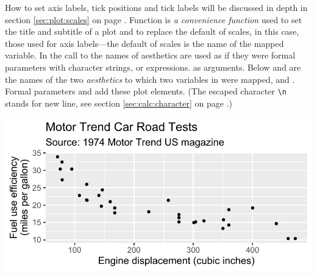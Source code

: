 \documentclass[krantz2]{krantz}\usepackage{knitr}
\begin{document}
How to set axis labels, tick positions and tick labels will be discussed in depth in section \ref{sec:plot:scales} on page \pageref{sec:plot:scales}. Function  is \emph{a convenience function} used to set the title and subtitle of a plot and to replace the default  of scales, in this case, those used for axis labels---the default  of scales is the name of the mapped variable. In the call to  the names of aesthetics are used as if they were formal parameters with character strings, or \Rlang expressions. as arguments. Below  and  are the names of the two \emph{aesthetics} to which two variables in  were mapped,  and . Formal parameters  and  add these plot elements. (The escaped character \verb|\n| stands for new line, see section \ref{sec:calc:character} on page \pageref{sec:calc:character}.)

\begin{knitrout}\footnotesize
{}\color{fgcolor}\begin{kframe}
\begin{alltt}
\hlstd{(} 
        \hlstd{=} \hlstd{(}    \hlopt{+}
  \hlstd{()} \hlopt{+}
  \hlstd{(} \hlstd{=} \hlstd{,}
        \hlstd{=} \hlstd{,}
        \hlstd{=} \hlstd{,}
        \hlstd{=} \hlstd{)}
\end{alltt}
\end{kframe}

{\centering \includegraphics[width=.7\textwidth]{figure/pos-ggplot-basics-11-1} 

}


\end{knitrout}
\end{document}
